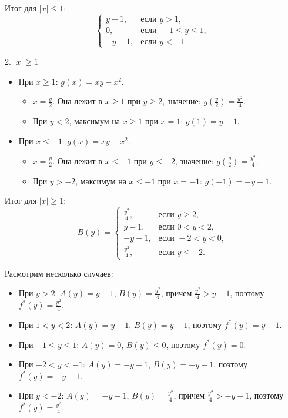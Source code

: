 \documentclass[12pt]{article}
\begin{document}
Итог для $ |x| \leq 1 $:
$$
\begin{cases}
y - 1, & \text{если } y > 1, \\
0, & \text{если } -1 \leq y \leq 1, \\
-y - 1, & \text{если } y < -1.
\end{cases}
$$

\vspace{15 mm}

2. $ |x| \geq 1 $

\begin{itemize}
\item При $ x \geq 1 $: $ g(x) = x y - x^2 $. 
  \begin{itemize}
  \item $ x = \frac{y}{2} $. Она лежит в $ x \geq 1 $ при $ y \geq 2 $, значение: $ g(\frac{y}{2}) = \frac{y^2}{4} $.
  \item При $ y < 2 $, максимум на $ x \geq 1 $ при $ x = 1 $: $ g(1) = y - 1 $.
  \end{itemize}
  
\item При $ x \leq -1 $: $ g(x) = x y - x^2 $.
  \begin{itemize}
  \item $ x = \frac{y}{2} $. Она лежит в $ x \leq -1 $ при $ y \leq -2 $, значение: $ g(\frac{y}{2}) = \frac{y^2}{4} $.
  \item При $ y > -2 $, максимум на $ x \leq -1 $ при $ x = -1 $: $ g(-1) = -y - 1 $.
  \end{itemize}
\end{itemize}

Итог для $ |x| \geq 1 $:
$$
B(y) = 
\begin{cases}
\frac{y^2}{4}, & \text{если } y \geq 2, \\
y - 1, & \text{если } 0 < y < 2, \\
-y - 1, & \text{если } -2 < y < 0, \\
\frac{y^2}{4}, & \text{если } y \leq -2.
\end{cases}
$$

Расмотрим несколько случаев:

\begin{itemize}
\item При $ y > 2 $: $ A(y) = y - 1 $, $ B(y) = \frac{y^2}{4} $, причем $ \frac{y^2}{4} > y - 1 $, поэтому $ f^*(y) = \frac{y^2}{4} $.
\item При $ 1 < y < 2 $: $ A(y) = y - 1 $, $ B(y) = y - 1 $, поэтому $ f^*(y) = y - 1 $.
\item При $ -1 \leq y \leq 1 $: $ A(y) = 0 $, $ B(y) \leq 0 $, поэтому $ f^*(y) = 0 $.
\item При $ -2 < y < -1 $: $ A(y) = -y - 1 $, $ B(y) = -y - 1 $, поэтому $ f^*(y) = -y - 1 $.
\item При $ y < -2 $: $ A(y) = -y - 1 $, $ B(y) = \frac{y^2}{4} $, причем $ \frac{y^2}{4} > -y - 1 $, поэтому $ f^*(y) = \frac{y^2}{4} $.
\end{itemize}
\end{document}
